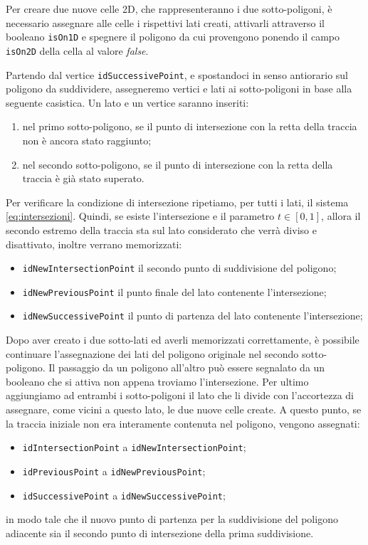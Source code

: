 \documentclass[a4paper]{article}
\begin{document}
Per creare due nuove celle 2D, che rappresenteranno i due sotto-poligoni, è necessario assegnare alle celle i rispettivi lati creati, attivarli attraverso il booleano \texttt{isOn1D} e spegnere il poligono da cui provengono ponendo il campo \texttt{isOn2D} della cella al valore \emph{false}.

Partendo dal vertice \texttt{idSuccessivePoint}, e spostandoci in senso antiorario sul poligono da suddividere, assegneremo vertici e lati ai sotto-poligoni in base alla seguente casistica.
Un lato e un vertice saranno inseriti: 
\begin{enumerate} 
\item nel primo sotto-poligono, se il punto di intersezione con la retta della traccia non è ancora stato raggiunto;
\item nel secondo sotto-poligono, se il punto di intersezione con la retta della traccia è già stato superato.
\end{enumerate}
Per verificare la condizione di intersezione ripetiamo, per tutti i lati, il sistema \eqref{eq:intersezioni}. Quindi, se esiste l'intersezione e il parametro $t \in [0,1]$, allora il secondo estremo della traccia sta sul lato considerato che verrà diviso e disattivato, inoltre verrano memorizzati: 
\begin{itemize} 
\item \texttt{idNewIntersectionPoint} il secondo punto di suddivisione del poligono;
\item \texttt{idNewPreviousPoint} il punto finale del lato contenente l'intersezione;
\item \texttt{idNewSuccessivePoint} il punto di partenza del lato contenente l'intersezione;
\end{itemize}
Dopo aver creato i due sotto-lati ed averli memorizzati correttamente, è possibile continuare l'assegnazione dei lati del poligono originale nel secondo sotto-poligono. Il passaggio da un poligono all'altro può essere segnalato da un booleano che si attiva non appena troviamo l'intersezione. Per ultimo aggiungiamo ad entrambi i sotto-poligoni il lato che li divide con l'accortezza di assegnare, come vicini a questo lato, le due nuove celle create.
A questo punto, se la traccia iniziale non era interamente contenuta nel poligono, vengono assegnati:
\begin{itemize} 
\item \texttt{idIntersectionPoint} a \texttt{idNewIntersectionPoint};
\item \texttt{idPreviousPoint} a \texttt{idNewPreviousPoint};
\item \texttt{idSuccessivePoint} a \texttt{idNewSuccessivePoint};
\end{itemize}
in modo tale che il nuovo punto di partenza per la suddivisione del poligono adiacente sia il secondo punto di intersezione della prima suddivisione.
\end{document}
